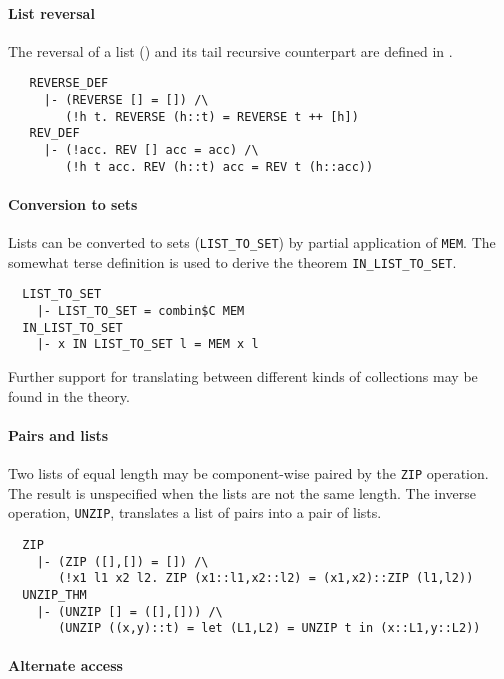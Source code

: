 \paragraph {List reversal}

The reversal of a list () and its tail recursive
counterpart  are defined in .
{\small
\begin{verbatim}
   REVERSE_DEF
     |- (REVERSE [] = []) /\
        (!h t. REVERSE (h::t) = REVERSE t ++ [h])
   REV_DEF
     |- (!acc. REV [] acc = acc) /\
        (!h t acc. REV (h::t) acc = REV t (h::acc))
\end{verbatim}
}

\paragraph {Conversion to sets}

Lists can be converted to sets ({\small\verb+LIST_TO_SET+}) by
partial application of {\small\verb+MEM+}. The somewhat
terse definition is used to derive the theorem
{\small\verb+IN_LIST_TO_SET+}.
%
{\small
\begin{verbatim}
  LIST_TO_SET
    |- LIST_TO_SET = combin$C MEM
  IN_LIST_TO_SET
    |- x IN LIST_TO_SET l = MEM x l
\end{verbatim}
}
%
Further support for translating between different kinds of
collections may be found in the  theory.

\paragraph {Pairs and lists}

Two lists of equal length may be component-wise paired by
the {\small\verb+ZIP+} operation. The result is unspecified
when the lists are not the same length. The inverse operation,
{\small\verb+UNZIP+}, translates a list of pairs into a pair of
lists.
%
{\small
\begin{verbatim}
  ZIP
    |- (ZIP ([],[]) = []) /\
       (!x1 l1 x2 l2. ZIP (x1::l1,x2::l2) = (x1,x2)::ZIP (l1,l2))
  UNZIP_THM
    |- (UNZIP [] = ([],[])) /\
       (UNZIP ((x,y)::t) = let (L1,L2) = UNZIP t in (x::L1,y::L2))
\end{verbatim}
}

\paragraph {Alternate access}

